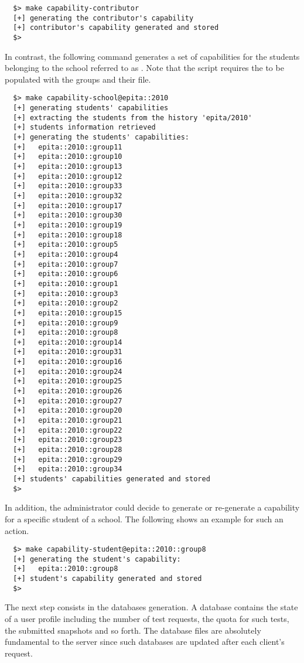 \begin{verbatim}
  $> make capability-contributor
  [+] generating the contributor's capability
  [+] contributor's capability generated and stored
  $> 
\end{verbatim}

In contrast, the following command generates a set of capabilities for the
students belonging to the school referred to as . Note
that the script requires the  to be populated
with the groups and their  file.

\begin{verbatim}
  $> make capability-school@epita::2010
  [+] generating students' capabilities
  [+] extracting the students from the history 'epita/2010'
  [+] students information retrieved
  [+] generating the students' capabilities:
  [+]   epita::2010::group11
  [+]   epita::2010::group10
  [+]   epita::2010::group13
  [+]   epita::2010::group12
  [+]   epita::2010::group33
  [+]   epita::2010::group32
  [+]   epita::2010::group17
  [+]   epita::2010::group30
  [+]   epita::2010::group19
  [+]   epita::2010::group18
  [+]   epita::2010::group5
  [+]   epita::2010::group4
  [+]   epita::2010::group7
  [+]   epita::2010::group6
  [+]   epita::2010::group1
  [+]   epita::2010::group3
  [+]   epita::2010::group2
  [+]   epita::2010::group15
  [+]   epita::2010::group9
  [+]   epita::2010::group8
  [+]   epita::2010::group14
  [+]   epita::2010::group31
  [+]   epita::2010::group16
  [+]   epita::2010::group24
  [+]   epita::2010::group25
  [+]   epita::2010::group26
  [+]   epita::2010::group27
  [+]   epita::2010::group20
  [+]   epita::2010::group21
  [+]   epita::2010::group22
  [+]   epita::2010::group23
  [+]   epita::2010::group28
  [+]   epita::2010::group29
  [+]   epita::2010::group34
  [+] students' capabilities generated and stored
  $> 
\end{verbatim}

In addition, the administrator could decide to generate or re-generate
a capability for a specific student of a school. The following shows an
example for such an action.

\begin{verbatim}
  $> make capability-student@epita::2010::group8
  [+] generating the student's capability:
  [+]   epita::2010::group8
  [+] student's capability generated and stored
  $> 
\end{verbatim}

The next step consists in the databases generation. A database contains the
state of a user profile including the number of test requests, the quota for
such tests, the submitted snapshots and so forth. The database files are
absolutely fundamental to the server since such databases are updated after
each client's request.

